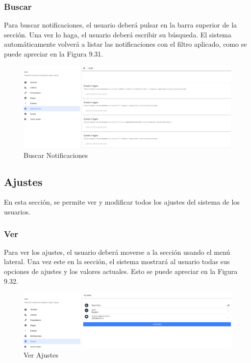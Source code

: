 \subsubsection{Buscar}
Para buscar notificaciones, el usuario deberá pulsar en la barra superior de la sección. Una vez lo haga, el usuario deberá escribir su búsqueda. El sistema automáticamente volverá a listar las notificaciones con el filtro aplicado, como se puede apreciar en la Figura 9.31.
\begin{figure}[H]
    \centering
    \includegraphics[width=0.7\linewidth]{images/user-manual/notifications/search.png}
    \caption{Buscar Notificaciones}
\end{figure}

\subsection{Ajustes}
En esta sección, se permite ver y modificar todos los ajustes del sistema de los usuarios.

\subsubsection{Ver}
Para ver los ajustes, el usuario deberá moverse a la sección usando el menú lateral. Una vez este en la sección, el sistema mostrará al usuario todas sus opciones de ajustes y los valores actuales. Esto se puede apreciar en la Figura 9.32.
\begin{figure}[H]
    \centering
    \includegraphics[width=0.7\linewidth]{images/user-manual/settings/list.png}
    \caption{Ver Ajustes}
\end{figure}

